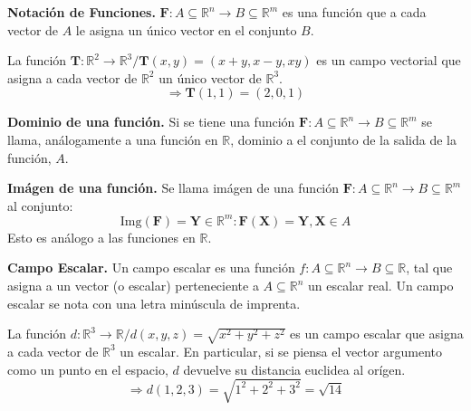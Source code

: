 \begin{definition}\textbf{Notación de Funciones.}
    $\mathbf{F}:A\subseteq \mathbb{R}^n \rightarrow B \subseteq \mathbb{R}^m$
    es una función que a cada vector de $A$ le asigna un único vector en el conjunto $B$.
    \begin{example}
        La función $\boldsymbol{T}:\mathbb{R}^2 \rightarrow \mathbb{R}^3 / \boldsymbol{T}(x,y) = (x+y,x-y,xy)$
        es un campo vectorial que asigna a cada vector de $\mathbb{R}^2$ un único vector de $\mathbb{R}^3$.
        \begin{equation*}
            \Rightarrow \boldsymbol{T}(1,1)=(2,0,1)
        \end{equation*}
        \label{ej:campoVectorial}
    \end{example}
\end{definition}
\begin{definition}\textbf{Dominio de una función.}
    Si se tiene una función $\mathbf{F}:A\subseteq \mathbb{R}^n \rightarrow B \subseteq \mathbb{R}^m$
    se llama, análogamente a una función en $\mathbb{R}$, dominio a el conjunto de la salida de la función, $A$.
\end{definition}
\begin{definition}\textbf{Imágen de una función.}
    Se llama imágen de una función \newline$\mathbf{F}:A\subseteq \mathbb{R}^n \rightarrow B \subseteq \mathbb{R}^m$ al conjunto:
    \begin{equation*}
        \text{Img}(\mathbf{F})={\boldsymbol{Y}\in\mathbb{R}^m: \mathbf{F}(\boldsymbol{X})=\boldsymbol{Y}, \boldsymbol{X} \in A}
    \end{equation*}
    Esto es análogo a las funciones en $\mathbb{R}$.
\end{definition}
\begin{definition}\textbf{Campo Escalar.}
    Un campo escalar es una función $f:A\subseteq \mathbb{R}^n \rightarrow B \subseteq \mathbb{R}$, tal que asigna
    a un vector (o escalar) perteneciente a $A\subseteq \mathbb{R}^n$ un escalar real.
    Un campo escalar se nota con una letra minúscula de imprenta.
    \begin{example}
        La función $d:\mathbb{R}^3 \rightarrow \mathbb{R} / d(x,y,z) = \sqrt{x^2+y^2+z^2}$
        es un campo escalar que asigna a cada vector de $\mathbb{R}^3$ un escalar. 
        En particular, si se piensa el vector argumento como un punto en el espacio, $d$ devuelve su distancia euclidea al orígen.
        \begin{equation*}
            \Rightarrow d(1,2,3)=\sqrt{1^2+2^2+3^2}=\sqrt{14}
        \end{equation*}
        \label{ej:campoEscalar}
    \end{example}
\end{definition}
